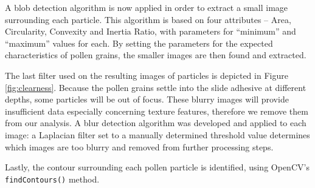 
A blob detection algorithm is now applied in order to extract a small image surrounding each particle. This algorithm is based on four attributes – Area, Circularity, Convexity and Inertia Ratio, with parameters for “minimum” and “maximum” values for each. By setting the parameters for the expected characteristics of pollen grains, the smaller images are then found and extracted.


The last filter used on the resulting images of particles is depicted in Figure \ref{fig:clearness}. Because the pollen grains settle into the slide adhesive at different depths, some particles will be out of focus. These blurry images will provide insufficient data especially concerning texture features, therefore we remove them from our analysis. A blur detection algorithm was developed and applied to each image: a Laplacian filter set to a manually determined threshold value determines which images are too blurry and removed from further processing steps. 

Lastly, the contour surrounding each pollen particle is identified, using OpenCV's \verb|findContours()| method. 

  
  
  
  